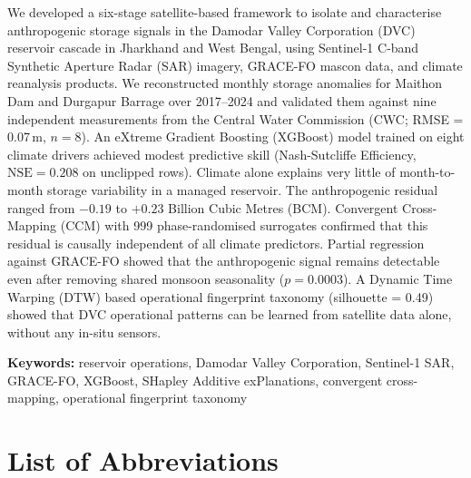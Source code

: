 \documentclass[12pt,a4paper,oneside]{report}
\newcommand{\NSE}{\mathrm{NSE}}
\begin{document}
We developed a six-stage satellite-based framework to isolate and characterise
anthropogenic storage signals in the Damodar Valley Corporation (DVC)
reservoir cascade in Jharkhand and West Bengal, using Sentinel-1 C-band
Synthetic Aperture Radar (SAR) imagery, GRACE-FO mascon data, and climate
reanalysis products. We reconstructed monthly storage anomalies for Maithon
Dam and Durgapur Barrage over 2017--2024 and validated them against nine
independent measurements from the Central Water Commission (CWC; RMSE =
0.07\,m, $n = 8$). An eXtreme Gradient Boosting (XGBoost) model trained on
eight climate drivers achieved modest predictive skill (Nash-Sutcliffe
Efficiency, $\NSE = 0.208$ on unclipped rows). Climate alone explains very
little of month-to-month storage variability in a managed reservoir. The
anthropogenic residual ranged from $-0.19$ to $+0.23$ Billion Cubic Metres
(BCM). Convergent Cross-Mapping (CCM) with 999 phase-randomised surrogates
confirmed that this residual is causally independent of all climate
predictors. Partial regression against GRACE-FO showed that the anthropogenic
signal remains detectable even after removing shared monsoon seasonality
($p = 0.0003$). A Dynamic Time Warping (DTW) based operational fingerprint
taxonomy (silhouette = 0.49) showed that DVC operational patterns can be
learned from satellite data alone, without any in-situ sensors.

\textbf{Keywords:} reservoir operations, Damodar Valley Corporation,
Sentinel-1 SAR, GRACE-FO, XGBoost, SHapley Additive exPlanations,
convergent cross-mapping, operational fingerprint taxonomy

\newpage
\tableofcontents
\newpage
\listoffigures
\newpage
\listoftables

\newpage
\chapter*{List of Abbreviations}
\end{document}
